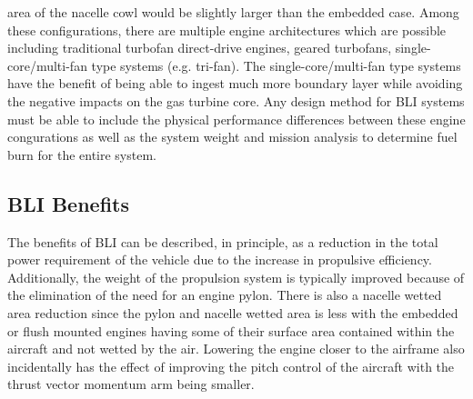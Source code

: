 area of the nacelle cowl would be slightly larger than the embedded case.  Among these configurations, there are multiple engine architectures which are possible including traditional turbofan direct-drive engines, geared turbofans, single-core/multi-fan type systems (e.g. tri-fan).  The single-core/multi-fan type systems have the benefit of being able to ingest much more boundary layer while avoiding the negative impacts on the gas turbine core.  Any design method for BLI systems must be able to include the physical performance differences between these engine congurations as well as the system weight and mission analysis to determine fuel burn for the entire system.

\subsection{BLI Benefits}
The benefits of BLI can be described, in principle, as a reduction in the total power requirement of the vehicle due to the increase in propulsive efficiency.  Additionally, the weight of the propulsion system is typically improved because of the elimination of the need for an engine pylon. There is also a nacelle wetted area reduction since the pylon and nacelle wetted area is less with the embedded or flush mounted engines having some of their surface area contained within the aircraft and not wetted by the air.  Lowering the engine closer to the airframe also incidentally has the effect of improving the pitch control of the aircraft with the thrust vector momentum arm being smaller.  

